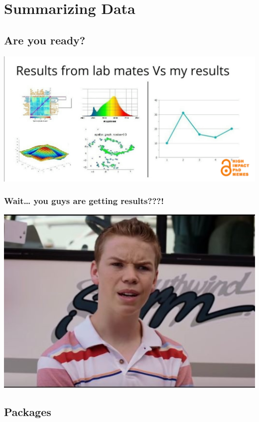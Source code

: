 \documentclass[
]{book}
\begin{document}
\chapter{Summarizing Data}\label{summarizing-data}

\section{Are you ready?}\label{are-you-ready}

\includegraphics{./img/fun_datvis_meme.png}

\subsection{Wait\ldots{} you guys are getting results???!}\label{wait-you-guys-are-getting-results}

\includegraphics{./img/wait_results.jpg}

\section{Packages}\label{packages-1}
\end{document}
